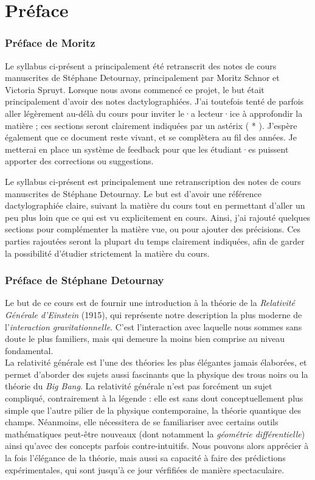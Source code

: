 \section{Préface}
\subsubsection{Préface de Moritz}
Le syllabus ci-présent a principalement été retranscrit des notes de cours manuscrites de Stéphane Detournay, principalement par Moritz Schnor et Victoria Spruyt. Lorsque nous avons commencé ce projet, le but était principalement d'avoir des notes dactylographiées. J'ai toutefois tenté de parfois aller légèrement au-délà du cours pour inviter le·a lecteur·ice à approfondir la matière ; ces sections seront clairement indiquées par un astérix ( * ). J'espère également que ce document reste vivant, et se complètera au fil des années. Je metterai en place un système de feedback pour que les étudiant·es puissent apporter des corrections ou suggestions. 



Le syllabus ci-présent est principalement une retranscription des notes de cours manuscrites de Stéphane Detournay. Le but est d'avoir une référence dactylographiée claire, suivant la matière du cours tout en permettant d'aller un peu plus loin que ce qui est vu explicitement en cours. Ainsi, j'ai rajouté quelques sections pour complémenter la matière vue, ou pour ajouter des précisions. Ces parties rajoutées seront la plupart du temps clairement indiquées, afin de garder la possibilité d'étudier strictement la matière du cours. 
\cutebreak
\subsubsection{Préface de Stéphane Detournay}
Le but de ce cours est de fournir une introduction à la théorie de la \emph{Relativité Générale d'Einstein} (1915), qui représente notre description la plus moderne de l'\emph{interaction gravitationnelle}. C'est l'interaction avec laquelle nous sommes sans doute le plus familiers, mais qui demeure la moins bien comprise au niveau fondamental.\\

La relativité générale est l'une des théories les plus élégantes jamais élaborées, et permet d'aborder des sujets aussi fascinants que la physique des trous noirs ou la théorie du \emph{Big Bang}. La relativité générale n'est pas forcément un sujet compliqué, contrairement à la légende : elle est sans dout conceptuellement plus simple que l'autre pilier de la physique contemporaine, la théorie quantique des champs. Néanmoins, elle nécessitera de se familiariser avec certains outils mathématiques peut-être nouveaux (dont notamment la \emph{géométrie différentielle}) ainsi qu'avec des concepts parfois contre-intuitifs. Nous pouvons alors apprécier à la fois l'élégance de la théorie, mais aussi sa capacité à faire des prédictions expérimentales, qui sont jusqu'à ce jour vérfifiées de manière spectaculaire.\\

